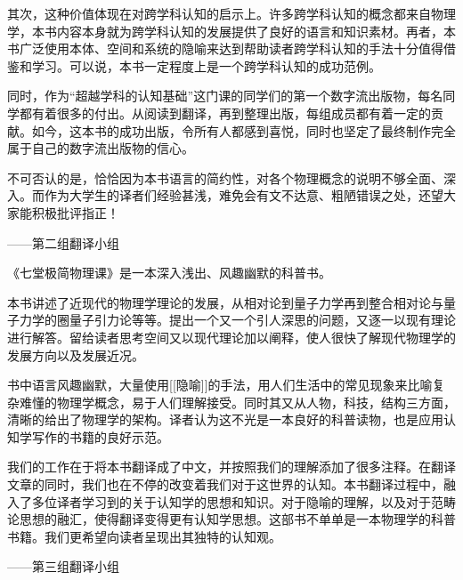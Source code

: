     其次，这种价值体现在对跨学科认知的启示上。许多跨学科认知的概念都来自物理学，本书内容本身就为跨学科认知的发展提供了良好的语言和知识素材。再者，本书广泛使用本体、空间和系统的隐喻来达到帮助读者跨学科认知的手法十分值得借鉴和学习。可以说，本书一定程度上是一个跨学科认知的成功范例。

    同时，作为“超越学科的认知基础”这门课的同学们的第一个数字流出版物，每名同学都有着很多的付出。从阅读到翻译，再到整理出版，每组成员都有着一定的贡献。如今，这本书的成功出版，令所有人都感到喜悦，同时也坚定了最终制作完全属于自己的数字流出版物的信心。

    不可否认的是，恰恰因为本书语言的简约性，对各个物理概念的说明不够全面、深入。而作为大学生的译者们经验甚浅，难免会有文不达意、粗陋错误之处，还望大家能积极批评指正！

                                                                                               ——第二组翻译小组

    《七堂极简物理课》是一本深入浅出、风趣幽默的科普书。

    本书讲述了近现代的物理学理论的发展，从相对论到量子力学再到整合相对论与量子力学的圈量子引力论等等。提出一个又一个引人深思的问题，又逐一以现有理论进行解答。留给读者思考空间又以现代理论加以阐释，使人很快了解现代物理学的发展方向以及发展近况。

    书中语言风趣幽默，大量使用[[隐喻]]的手法，用人们生活中的常见现象来比喻复杂难懂的物理学概念，易于人们理解接受。同时其又从人物，科技，结构三方面，清晰的给出了物理学的架构。译者认为这不光是一本良好的科普读物，也是应用认知学写作的书籍的良好示范。

    我们的工作在于将本书翻译成了中文，并按照我们的理解添加了很多注释。在翻译文章的同时，我们也在不停的改变着我们对于这世界的认知。本书翻译过程中，融入了多位译者学习到的关于认知学的思想和知识。对于隐喻的理解，以及对于范畴论思想的融汇，使得翻译变得更有认知学思想。这部书不单单是一本物理学的科普书籍。我们更希望向读者呈现出其独特的认知观。

                                                                                               ——第三组翻译小组




	\noindent